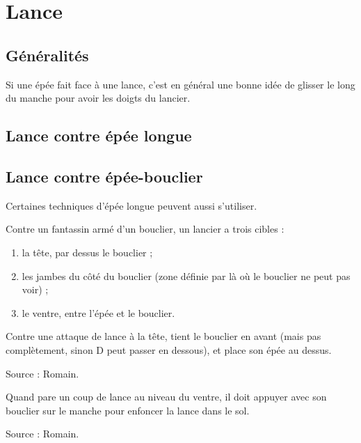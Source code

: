 \chapter{Lance}


\section{Généralités}


Si une épée fait face à une lance, c'est en général une bonne idée de glisser le long du manche pour avoir les doigts du lancier.


\section{Lance contre épée longue}




\section{Lance contre épée-bouclier}

Certaines techniques d'épée longue peuvent aussi s'utiliser.

Contre un fantassin armé d'un bouclier, un lancier a trois cibles :
\begin{enumerate}
	\item la tête, par dessus le bouclier ;
	\item les jambes du côté du bouclier (zone définie par là où le bouclier ne peut pas voir) ;
	\item le ventre, entre l'épée et le bouclier.
\end{enumerate}


\begin{garde}
Contre une attaque de lance à la tête, \D tient le bouclier en avant (mais pas complètement, sinon D peut passer en dessous), et place son épée au dessus.

Source : Romain.
\end{garde}


\begin{technique}
Quand \D pare un coup de lance au niveau du ventre, il doit appuyer avec son bouclier sur le manche pour enfoncer la lance dans le sol.

Source : Romain.
\end{technique}



